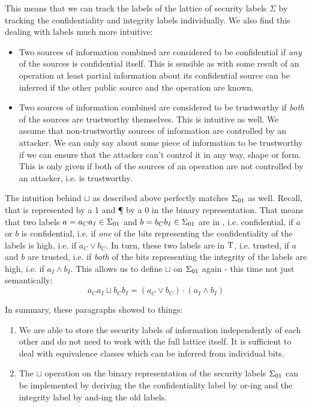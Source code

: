 This means that we can track the labels of the lattice of security labels $ \Sigma $ by tracking the confidentiality and integrity labels individually.
We also find this dealing with labels much more intuitive:
\begin{itemize}
    \item Two sources of information combined are considered to be confidential if \textit{any} of the sources is confidential itself.
    This is sensible as with some result of an operation at least partial information about its confidential source can be inferred if the other public source and the operation are known.
    \item Two sources of information combined are considered to be trustworthy if \textit{both} of the sources are trustworthy themselves.
    This is intuitive as well.
    We assume that non-trustworthy sources of information are controlled by an attacker.
    We can only say about some piece of information to be trustworthy if we can ensure that the attacker can't control it in any way, shape or form.
    This is only given if both of the sources of an operation are not controlled by an attacker, i.e. is trustworthy.
\end{itemize}

The intuition behind $ \sqcup $ as described above perfectly matches $ \Sigma_{01} $ as well.
Recall, that \C{} is represented by a 1 and \P{} by a 0 in the binary representation.
That means that two labels $ a = a_Ca_I \in \Sigma_{01} $ and $ b = b_Cb_I \in \Sigma_{01} $ are in \C{}, i.e. confidential, if $ a $ or $ b $ is confidential, i.e. if \textit{one} of the bits representing the confidentiality of the labels is high, i.e. if $ a_C \lor b_C $.
In turn, these two labels are in $ \text{T} $, i.e. trusted, if $ a $ and $ b $ are trusted, i.e. if \textit{both} of the bits representing the integrity of the labels are high, i.e. if $ a_I \land b_I $.
This allows us to define $ \sqcup $ on $ \Sigma_{01} $ again - this time not just semantically:
\begin{equation*}
    a_C a_I \sqcup b_C b_I = (a_C \lor b_C) \cdot (a_I \land b_I)
\end{equation*}

In summary, these paragraphs showed to things:
\begin{enumerate}
    \item We are able to store the security labels of information independently of each other and do not need to work with the full lattice itself.
    It is sufficient to deal with equivalence classes which can be inferred from individual bits.
    \item The $ \sqcup $ operation on the binary representation of the security labels $ \Sigma_{01} $ can be implemented by deriving the the confidentiality label by or-ing and the integrity label by and-ing the old labels.
\end{enumerate}

